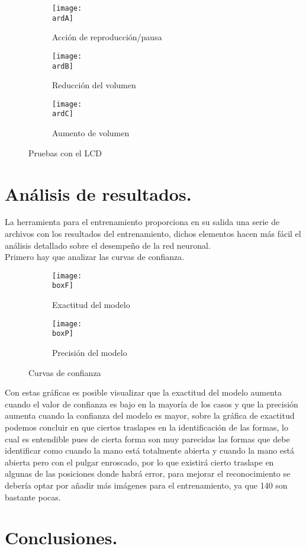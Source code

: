 \documentclass[a4paper, 12pt]{article}
\newcommand{\ardA}{img/ard_1.png}
\newcommand{\ardB}{img/ard_2.png}
\newcommand{\ardC}{img/ard_3.png}
\newcommand{\boxF}{img/BoxF1_curve.png}
\newcommand{\boxP}{img/BoxP_curve.png}
\begin{document}
	\begin{figure}[H]
		\begin{subfigure}[h]{0.5\textwidth}
			\texttt{[image: \\ardA]}
			\caption{Acción de reproducción/pausa}
		\end{subfigure}
		\begin{subfigure}[h]{0.5\textwidth}
			\texttt{[image: \\ardB]}
			\caption{Reducción del volumen}
		\end{subfigure}
		\begin{subfigure}[h]{1\textwidth}
			\centering
			\texttt{[image: \\ardC]}
			\caption{Aumento de volumen}
		\end{subfigure}
		\caption{Pruebas con el LCD}
	\end{figure}
	\clearpage

	\section{Análisis de resultados.}
	La herramienta para el entrenamiento proporciona en su salida una serie de archivos con los resultados del entrenamiento, dichos elementos hacen más fácil el análisis detallado sobre el desempeño de la red neuronal.\\
    Primero hay que analizar las curvas de confianza.

	\begin{figure}[H]
        \centering
		\begin{subfigure}{0.45\linewidth}
			\texttt{[image: \\boxF]}
			\label{F1_curve}
			\caption{Exactitud del modelo}
		\end{subfigure}
		\begin{subfigure}{0.45\linewidth}
			\texttt{[image: \\boxP]}
			\label{P_curve}
			\caption{Precisión del modelo}
		\end{subfigure}
		\caption{Curvas de confianza}
	\end{figure}

	Con estas gráficas es posible visualizar que la exactitud del modelo aumenta cuando el valor de confianza es bajo en la mayoría de los casos y que la precisión aumenta cuando la confianza del modelo es mayor, sobre la gráfica de exactitud podemos concluir en que ciertos traslapes en la identificación de las formas, lo cual es entendible pues de cierta forma son muy parecidas las formas que debe identificar como cuando la mano está totalmente abierta y cuando la mano está abierta pero con el pulgar enroscado, por lo que existirá cierto traslape en algunas de las posiciones donde habrá error, para mejorar el reconocimiento se debería optar por añadir más imágenes para el entrenamiento, ya que 140 son bastante pocas.

    \section{Conclusiones.}
\end{document}
